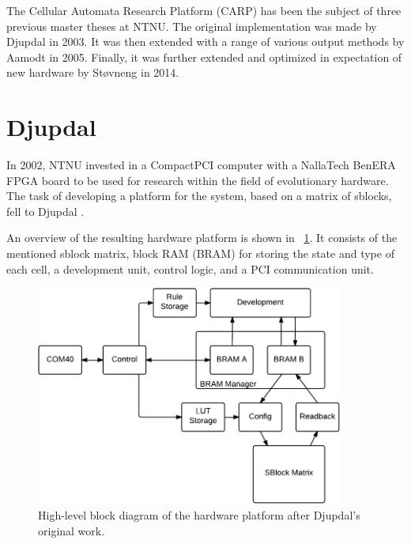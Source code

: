 The Cellular Automata Research Platform (CARP) has been the subject of three previous master theses at NTNU.
The original implementation was made by Djupdal in 2003.
It was then extended with a range of various output methods by Aamodt in 2005.
Finally, it was further extended and optimized in expectation of new hardware by Støvneng in 2014.


\section{Djupdal}

In 2002, NTNU invested in a CompactPCI computer with a NallaTech BenERA FPGA board to be used for research within the field of evolutionary hardware.
The task of developing a platform for the system, based on a matrix of sblocks, fell to Djupdal \cite{djupdal2003sblock}.

An overview of the resulting hardware platform is shown in \figurename~\ref{fig:overview-djupdal}.
It consists of the mentioned sblock matrix, block RAM (BRAM) for storing the state and type of each cell, a development unit, control logic, and a PCI communication unit.

\begin{figure}[!ht]
    \centering
    \includegraphics[width=0.9\textwidth]{figures/overview-djupdal}
    \caption[Djupdal's hardware design.]{
        High-level block diagram of the hardware platform after Djupdal's original work.
    }
    \label{fig:overview-djupdal}
\end{figure}

